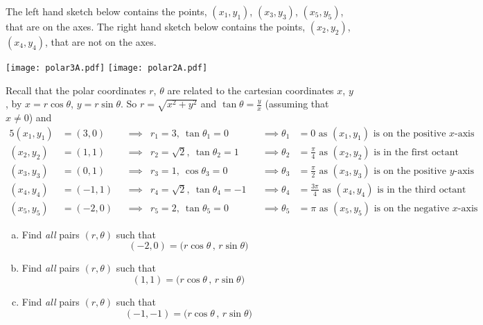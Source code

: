 \begin{solution}
The left hand sketch below contains the points, $(x_1,y_1)$, $(x_3,y_3)$,
$(x_5,y_5)$, that are on the axes. The right hand sketch below contains the
points, $(x_2,y_2)$, $(x_4,y_4)$, that are not on the axes.
\begin{center}
  \texttt{[image: polar3A.pdf]}\quad
  \texttt{[image: polar2A.pdf]}
\end{center}
Recall that the polar coordinates $r$, $\theta$
are related to the cartesian coordinates $x$, $y$, by $x=r\cos\theta$,
$y=r\sin\theta$. So $r=\sqrt{x^2+y^2}$ and $\tan\theta=\frac{y}{x}$
(assuming that $x\ne 0$) and
\begin{alignat*}{5}
(x_1,y_1) &= (3,0) &&\implies &r_1=3,\ \tan\theta_1=0
                   &&\implies \theta_1&=0 
                   \text{ as $(x_1,y_1)$ is on the positive $x$-axis} \\
(x_2,y_2) &= (1,1) &&\implies &r_2=\sqrt{2},\ \tan\theta_2=1
                   &&\implies \theta_2&=\frac{\pi}{4} 
                   \text{ as $(x_2,y_2)$ is in the first octant} \\
(x_3,y_3) &= (0,1) &&\implies &r_3=1,\ \cos\theta_3=0
                   &&\implies \theta_3&=\frac{\pi}{2} 
                   \text{ as $(x_3,y_3)$ is on the positive $y$-axis} \\
(x_4,y_4) &= (-1,1) &&\implies &r_4=\sqrt{2},\ \tan\theta_4=-1
                   &&\implies \theta_4&=\frac{3\pi}{4} 
                   \text{ as $(x_4,y_4)$ is in the third octant} \\
(x_5,y_5) &= (-2,0) &&\implies &r_5=2,\ \tan\theta_5=0
                   &&\implies \theta_5&=\pi 
                   \text{ as $(x_5,y_5)$ is on the negative $x$-axis} 
\end{alignat*}
\end{solution}


\begin{question}
\begin{enumerate}[(a)]
\item
Find \emph{all} pairs $(r,\theta)$ such that
\begin{equation*}
(-2,0) = \big(r\cos\theta\,,\,r\sin\theta\big)
\end{equation*}
\item
Find \emph{all} pairs $(r,\theta)$ such that
\begin{equation*}
(1,1) = \big(r\cos\theta\,,\,r\sin\theta\big)
\end{equation*}
\item
Find \emph{all} pairs $(r,\theta)$ such that
\begin{equation*}
(-1,-1) = \big(r\cos\theta\,,\,r\sin\theta\big)
\end{equation*}
\end{enumerate}
\end{question}

